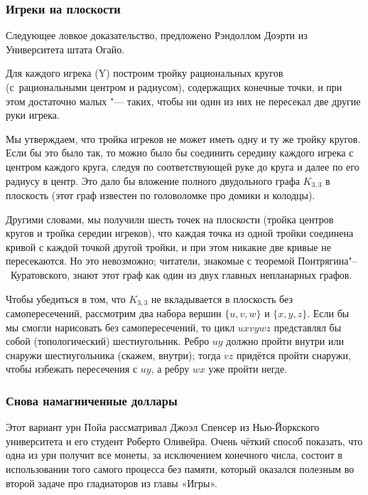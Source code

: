 \documentclass[twoside]{book}
\begin{document}
\subsubsection*{Игреки на плоскости}

Следующее ловкое  доказательство, предложено Рэндоллом Доэрти из Университета штата Огайо.


Для каждого игрека (Y) построим тройку рациональных кругов (с~рациональными центром и радиусом), содержащих конечные точки, и при этом достаточно малых "--- таких, чтобы ни один из них не пересекал две другие руки игрека.

Мы утверждаем, что тройка игреков не может иметь одну и ту же тройку кругов.
Если бы это было так, то можно было бы соединить середину каждого игрека с центром каждого круга, следуя по соответствующей руке до круга и далее по его радиусу в центр.
Это дало бы вложение полного двудольного графа $K_{3,3}$ в плоскость (этот граф известен по головоломке про домики и колодцы).

Другими словами, мы получили шесть  точек на плоскости (тройка центров кругов и тройка середин игреков), что каждая точка из одной тройки соединена кривой с каждой точкой другой тройки, и при этом никакие две кривые не пересекаются.
Но это невозможно; читатели, знакомые с теоремой Понтрягина"--~Куратовского, знают этот граф как один из двух главных непланарных графов.

Чтобы убедиться в том, что $K_{3,3}$ не вкладывается в плоскость без самопересечений, рассмотрим два набора вершин $\{u, v, w\}$ и $\{x, y, z\}$.
Если бы мы смогли нарисовать  без самопересечений, то цикл $uxvywz$ представлял бы  собой (топологический) шестиугольник.
Ребро $uy$ должно пройти внутри или снаружи шестиугольника (скажем, внутри);
тогда  $vz$ придётся пройти снаружи, чтобы избежать пересечения с $uy$, а ребру $wx$ уже пройти негде.
\heart

\subsubsection*{Снова  намагниченные доллары}

Этот вариант урн Пойа рассматривал Джоэл Спенсер из Нью-Йоркского университета и его студент Роберто Оливейра.
Очень чёткий способ показать, что одна из урн получит все монеты, за исключением конечного числа, состоит в использовании того самого процесса без памяти, который оказался полезным во второй задаче про гладиаторов из главы «\mbox{Игры}».
\end{document}
